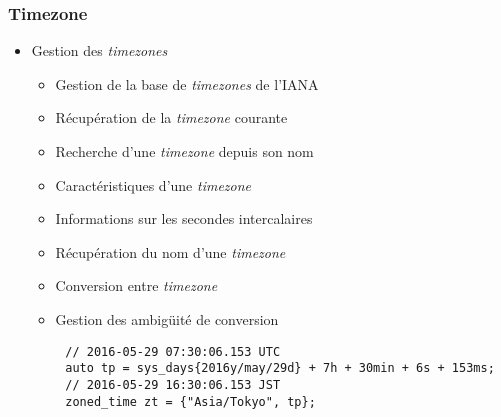\documentclass[C++.tex]{subfiles}
\begin{document}
\begin{frame}[fragile]
	\frametitle{Timezone}
	\begin{itemize}
		\item Gestion des \textit{timezones}
		\begin{itemize}
			\item Gestion de la base de \textit{timezones} de l'IANA


			\item Récupération de la \textit{timezone} courante
			\item Recherche d'une \textit{timezone} depuis son nom
			\item Caractéristiques d'une \textit{timezone}
			\item Informations sur les secondes intercalaires
			\item Récupération du nom d'une \textit{timezone}
			\item Conversion entre \textit{timezone}
			\item Gestion des ambigüité de conversion
		\end{itemize}
	\end{itemize}

	\begin{verbatim}
		// 2016-05-29 07:30:06.153 UTC
		auto tp = sys_days{2016y/may/29d} + 7h + 30min + 6s + 153ms;
		// 2016-05-29 16:30:06.153 JST
		zoned_time zt = {"Asia/Tokyo", tp};
	\end{verbatim}


\end{frame}
\end{document}
